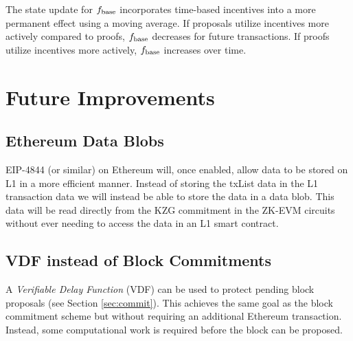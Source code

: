 \documentclass[9pt,oneside]{amsart}
\begin{document}
\begin{multicols}{2}

The state update for $f_\textnormal{base}$ incorporates time-based incentives into a more permanent effect using a moving average. If proposals utilize incentives more actively compared to proofs, $f_\textnormal{base}$ decreases for future transactions. If proofs utilize incentives more actively, $f_\textnormal{base}$ increases over time.



\label{sec:priceStateUpdate}
\color{Black}
\section{Future Improvements}\label{sec:improvements}

\subsection{Ethereum Data Blobs}\label{sec:datablobs}
EIP-4844 \cite{eip4844} (or similar) on Ethereum will, once enabled, allow data to be stored on L1 in a more efficient manner. Instead of storing the txList data in the L1 transaction data we will instead be able to store the data in a data blob. This data will be read directly from the KZG commitment in the ZK-EVM circuits without ever needing to access the data in an L1 smart contract.

\subsection{VDF instead of Block Commitments}\label{sec:vdf}
A \emph{Verifiable Delay Function} (VDF) can be used to protect pending block proposals (see Section \ref{sec:commit}). This achieves the same goal as the block commitment scheme but without requiring an additional Ethereum transaction. Instead, some computational work is required before the block can be proposed.


\end{multicols}
\end{document}
